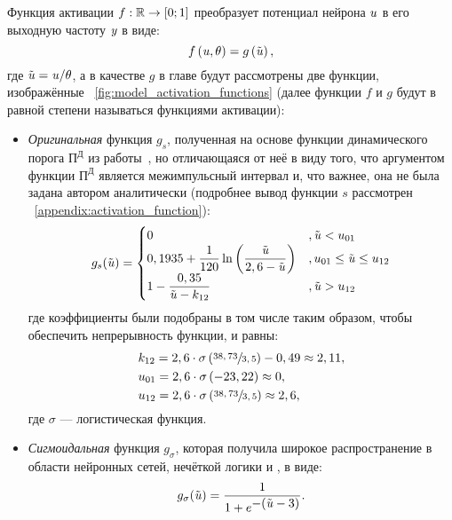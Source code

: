 Функция активации $f: \mathbb{R} \to \left[0;1\right]$ преобразует потенциал нейрона $\mathit{u}$ в его выходную частоту $\mathit{y}$ в виде:
\begin{equation}
    \label{eq:activation_function}
    f\left( \mathit{u}, \theta \right) = g\left( \tilde{\mathit{u}} \right), 
\end{equation}
где $\tilde{\mathit{u}} = \mathit{u} / \theta$, а в качестве $g$ в главе будут рассмотрены две функции, изображённые \onfigure~\ref{fig:model_activation_functions} (далее функции $f$ и $g$ будут в равной степени называться функциями активации):
\begin{itemize}
	\item \textit{Оригинальная} функция $g_{s}$, полученная на основе функции динамического порога $\text{П}^\text{Д}$ из работы~\cite{EmelyanovYaroslavsky1990}, но отличающаяся от неё в виду того, что аргументом функции  $\text{П}^\text{Д}$ является межимпульсный интервал и, что важнее, она не была задана автором аналитически (подробнее вывод функции $s$ рассмотрен \inappendix~\ref{appendix:activation_function}):
		\begin{equation}
            \label{eq:activation_function_original}
            g_{s}(\tilde{\mathit{u}}) = 
            \begin{cases}
                0                                                                                               &, \tilde{\mathit{u}} < u_{01} \\
                0,1935 + \dfrac{1}{120} \ln\left( \dfrac{\tilde{\mathit{u}}}{2,6 - \tilde{\mathit{u}}} \right)  &, u_{01} \le \tilde{\mathit{u}} \le u_{12} \\
                1 - \dfrac{0,35}{\tilde{\mathit{u}} - k_{12}}                                                   &, \tilde{\mathit{u}} > u_{12} \\
            \end{cases}
		\end{equation}
        где коэффициенты были подобраны в том числе таким образом, чтобы обеспечить непрерывность функции, и равны: 
        \begin{align*}
            &k_{12} = 2,6 \cdot \sigma\left(\sfrac{38,73}{3,5}\right) - 0,49 \approx 2,11, \\
            &u_{01} = 2,6\cdot\sigma\left(-23,22\right) \approx 0, \\
            &u_{12} = 2,6 \cdot \sigma\left(\sfrac{38,73}{3,5}\right) \approx 2,6,
        \end{align*}
        где $\sigma$ --- логистическая функция.
	\item \textit{Сигмоидальная} функция $g_{\sigma}$, которая получила широкое распространение в области нейронных сетей, нечёткой логики и \other, в виде:
		\begin{equation}
            \label{eq:activation_function_sigma}
			g_{\sigma}(\tilde{\mathit{u}}) = \dfrac{1}{1 + e^{\displaystyle -(\tilde{\mathit{u}} - 3)}}.
		\end{equation}
\end{itemize}

